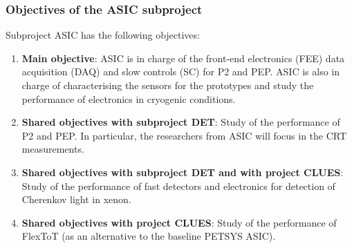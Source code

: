 \subsubsection*{Objectives of the ASIC subproject}
Subproject ASIC has the following objectives:
\begin{enumerate}
\item {\bf Main objective}: ASIC is in charge of the front-end electronics (FEE) data acquisition (DAQ) and slow controls (SC) for P2 and PEP. ASIC is also in charge of characterising the sensors for the prototypes and study the performance of electronics in cryogenic conditions. 
\item {\bf Shared objectives with subproject DET}: Study of the performance of P2 and PEP. In particular, the researchers from ASIC will focus in the CRT measurements. 
\item {\bf Shared objectives with subproject DET and with project CLUES}: Study of the performance of fast detectors and electronics for detection of Cherenkov light in xenon.
\item {\bf Shared objectives with project CLUES}: Study of the performance of FlexToT (as an alternative to the baseline PETSYS ASIC). 
\end{enumerate}

